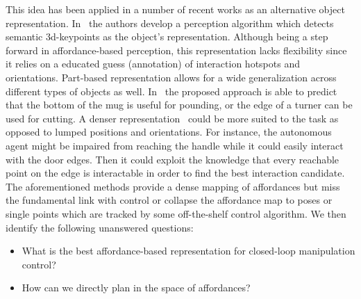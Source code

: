 This idea has been applied in a number of recent works as an alternative object representation. 
In~\cite{gao2021kpam} the authors develop a perception algorithm which detects semantic 3d-keypoints as the object's representation. Although being a step forward in affordance-based perception, this representation lacks flexibility since it relies on a educated guess (annotation) of interaction hotspots and orientations. Part-based representation allows for a wide generalization across different types of objects as well. In~\cite{myers2015affordance} the proposed approach is able to predict that the bottom of the mug is useful for pounding, or the edge of a turner can be used for cutting. A denser representation~\cite{nagarajan2019grounded, mo2021where2act} could be more suited to the task as opposed to lumped positions and orientations. For instance, the autonomous agent might be impaired from reaching the handle while it could easily interact with the door edges. Then it could exploit the knowledge that every reachable point on the edge is interactable in order to find the best interaction candidate. The aforementioned methods provide a dense mapping of affordances but miss the fundamental link with control or collapse the affordance map to poses or single points which are tracked by some off-the-shelf control algorithm. 
We then identify the following unanswered questions:
\begin{itemize}
\item What is the best affordance-based representation for closed-loop manipulation control? 
\item How can we directly plan in the space of affordances?
\end{itemize} 
 
